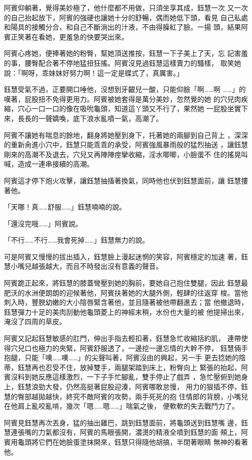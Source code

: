 阿賓仰躺著，覺得美妙極了，他什麼都不用做，只須坐享其成，鈺慧一次
又一次的自己抬起放下，阿賓的強硬也讓她十分的舒暢，偶而她低下頭，看見
自己私處和陽具的接觸分合，和自己不斷淌出的汁液，不由得臊紅了臉。一揚
頭，結果阿賓正笑著在看她，更羞急的快要哭出來。

阿賓心疼她，便捧著她的粉臀，幫她頂送推按，鈺慧一下子美上了天，忘
記害羞的事，腰臀配合著不停地猛扭狂搖。阿賓沒見過鈺慧這樣賣力的騷樣，
取笑她說：「啊呀，乖妹妹好努力啊！這一定是蝶式了，真厲害。」

鈺慧受氣不過，正要開口唾他，沒想到牙齦兒一酸，只能仰臉「啊……啊
……」的嘆著，屁股扭不免得更用力。阿賓被她套得是萬分美妙，忽然覺的她
的穴兒肉疾縮，穴心一口一口的像在吸吮龜頭，知道這丫頭又不行了，果然她
一屁股坐實下來，長長的一聲嬌喚，底下浪水亂噴一氣，高潮了。

阿賓不讓她有喘息的餘地，翻身將她壓到身下，托著她的兩腳到自己背上
，深深的重新肏進小穴中，鈺慧只能乖乖的承受，阿賓強風暴雨般的猛烈抽送
，讓鈺慧剛來的高潮不及退去，穴兒又再陣陣痙攣收縮，淫水唧唧，小臉蛋不
住的搖晃叫喊，造成一連串接續的高潮。

阿賓這才停下炮火攻擊，讓鈺慧抽搐著換氣，同時他也伏到鈺慧面前，讓
鈺慧摟著他。

「天哪！真……舒服……」鈺慧喃喃的說。

「還沒完哦……」阿賓說。

「不行……不行……我會死掉……」鈺慧無力的說。

可是阿賓又慢慢的拔出插入，鈺慧臉上漫起迷惘的笑容，阿賓穩定的加速
著，鈺慧小嘴兒越張越大，而且不時發出沒有意義的聲音。

阿賓跪正起來，將鈺慧的膝蓋彎壓到她的胸前，要她自己抱住雙腿，因此
鈺慧最肥沃的水洲便朗朗的迎候著他，阿賓扶著她的大腿外側，輕肆的往返穿
梭。當他刺入時，豐腴幼嫩的大小陰唇緊含著他，並且隨著被他帶翻進去；當
他撤退時，鈺慧彈力十足的美肉刮動他龜頭菱上的神經末稍，水份也大量的被
他提掃出來，淹沒了四周的草皮。

阿賓又記起鈺慧敏感的肛門，伸出手指去輕扣著，鈺慧急忙收縮括約肌，
連帶使得穴兒口也極力的夾緊，阿賓舒服透了，一邊挖一邊忘情的大幹不停，
鈺慧倆手抱腿，只能「噢……噢……」的尖聲叫著，阿賓沒由的興起，另一手
更去捻她的陰蒂，鈺慧再也忍受不住，放掉雙手，兩腿架踏到床上，粉臀向上
緊張的抬起，阿賓沒料到她反應這樣激烈，一下子手忙腳亂，雙手停止了戲弄
，急忙壓俯到她身上，鈺慧浪勁大發，仍然高挺著屁股迎湊，阿賓哪敢怠慢，
用力的狠插不停，鈺慧的臀部越拋越快，終究不敵阿賓的攻勢，兩手死死的抱
住情郎的背膀，小嘴兒在他肩上亂咬亂啃，幾次「嗯……嗯……」喘氣之後，
便軟軟的失去戰鬥力了。

阿賓見鈺慧再次丟身，猛的抽出雞巴，跳到鈺慧面前，將龜頭送到鈺慧嘴
邊，鈺慧連張嘴的力氣都沒有，阿賓的馬眼張開，濃燙的精液全噴到鈺慧的面
頰上，阿賓用龜頭將它們在她臉蛋塗抹開來，鈺慧只得隨他胡搞，半閉著眼睛
無神的看著他。


